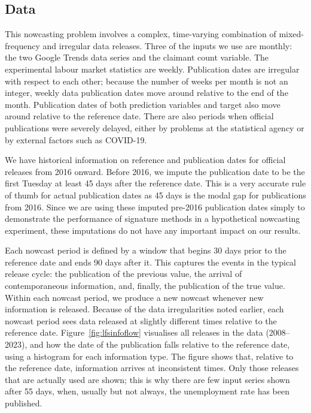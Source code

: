 \documentclass[a4paper, 12pt]{article}
\theoremstyle{remark}
\begin{document}
\subsection{Data}

This nowcasting problem involves a complex, time-varying combination of mixed-frequency and irregular data releases. Three of the inputs we use are monthly: the two Google Trends data series and the claimant count variable. The experimental labour market statistics are weekly. Publication dates are irregular with respect to each other; because the number of weeks per month is not an integer, weekly data publication dates move around relative to the end of the month. Publication dates of both prediction variables and target also move around relative to the reference date.
There are also periods when official publications were severely delayed, either by problems at the statistical agency or by external factors such as COVID-19. 

We have historical information on reference and publication dates for official releases from 2016 onward. Before 2016, we impute the publication date to be the first Tuesday at least 45 days after the reference date. This is a very accurate rule of thumb for actual publication dates as 45 days is the modal gap for publications from 2016. Since we are using these imputed pre-2016 publication dates simply to demonstrate the performance of signature methods in a hypothetical nowcasting experiment, these imputations do not have any important impact on our results.

Each nowcast period is defined by a window that begins 30 days prior to the reference date and ends 90 days after it. This captures the events in the typical release cycle: the publication of the previous value, the arrival of contemporaneous information, and, finally, the publication of the true value. Within each nowcast period, we produce a new nowcast whenever new information is released. Because of the data irregularities noted earlier, each nowcast period sees data released at slightly different times relative to the reference date. Figure~\ref{fig:lfsinfoflow} visualises all releases in the data (2008--2023), and how the date of the publication falls relative to the reference date, using a histogram for each information type. The figure shows that, relative to the reference date, information arrives at inconsistent times. Only those releases that are actually used are shown; this is why there are few input series shown after 55 days, when, usually but not always, the unemployment rate has been published.
\end{document}

